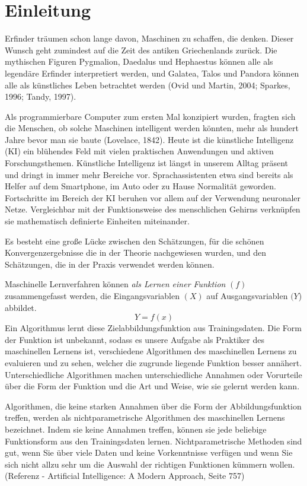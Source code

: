 \chapter*{Einleitung}

Erfinder träumen schon lange davon, Maschinen zu schaffen, die denken. Dieser Wunsch geht zumindest auf die Zeit des antiken Griechenlands zurück. Die mythischen Figuren Pygmalion, Daedalus und Hephaestus können alle als legendäre Erfinder interpretiert werden, und Galatea, Talos und Pandora können alle als künstliches Leben betrachtet werden (Ovid und Martin, 2004; Sparkes, 1996; Tandy, 1997).

Als programmierbare Computer zum ersten Mal konzipiert wurden, fragten sich die Menschen, ob solche Maschinen intelligent werden könnten, mehr als hundert Jahre bevor man sie baute (Lovelace, 1842). Heute ist die künstliche Intelligenz (KI) ein blühendes Feld mit vielen praktischen Anwendungen und aktiven Forschungsthemen. 
Künstliche Intelligenz ist längst in unserem Alltag präsent und dringt in immer mehr Bereiche vor. Sprachassistenten etwa sind bereits als Helfer auf dem Smartphone, im Auto oder zu Hause Normalität geworden. Fortschritte im Bereich der KI beruhen vor allem auf der Verwendung neuronaler Netze. Vergleichbar mit der Funktionsweise des menschlichen Gehirns verknüpfen sie mathematisch definierte Einheiten miteinander.

Es besteht eine große Lücke zwischen den Schätzungen, für die schönen Konvergenzergebnisse die in der Theorie nachgewiesen wurden, und den Schätzungen, die in der Praxis verwendet werden können.

Maschinelle Lernverfahren können \emph{als Lernen einer Funktion} $(f)$ zusammengefasst werden, die Eingangsvariablen $(X)$ auf Ausgangsvariablen $(Y$) abbildet.
$$Y = f(x)$$
Ein Algorithmus lernt diese Zielabbildungsfunktion aus Trainingsdaten.
Die Form der Funktion ist unbekannt, sodass es unsere Aufgabe als Praktiker des maschinellen Lernens ist, verschiedene Algorithmen des maschinellen Lernens zu evaluieren und zu sehen, welcher die zugrunde liegende Funktion besser annähert.
Unterschiedliche Algorithmen machen unterschiedliche Annahmen oder Vorurteile über die Form der Funktion und die Art und Weise, wie sie gelernt werden kann.

Algorithmen, die keine starken Annahmen über die Form der Abbildungsfunktion treffen, werden als nichtparametrische Algorithmen des maschinellen Lernens bezeichnet. Indem sie keine Annahmen treffen, können sie jede beliebige Funktionsform aus den Trainingsdaten lernen.
Nichtparametrische Methoden sind gut, wenn Sie über viele Daten und keine Vorkenntnisse verfügen und wenn Sie sich nicht allzu sehr um die Auswahl der richtigen Funktionen kümmern wollen. (Referenz - Artificial Intelligence: A Modern Approach, Seite 757)

